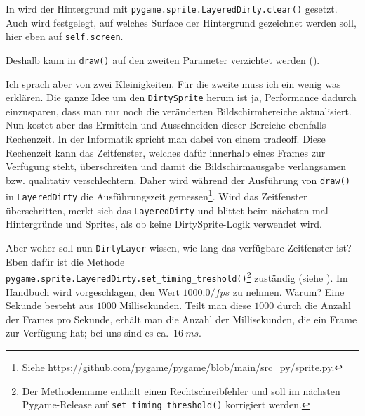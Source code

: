 In  wird der Hintergrund mit \texttt{pygame.sprite.LayeredDirty.clear()} gesetzt. Auch wird festgelegt, auf welches Surface der Hintergrund gezeichnet werden soll, hier eben auf \texttt{self.screen}.


Deshalb kann in \texttt{draw()} auf den zweiten Parameter verzichtet werden ().


Ich sprach aber von zwei Kleinigkeiten. Für die zweite muss ich ein wenig was erklären. Die ganze Idee um den \texttt{DirtySprite} herum ist ja, Performance dadurch einzusparen, dass man nur noch die veränderten Bildschirmbereiche aktualisiert. Nun kostet aber das Ermitteln und Ausschneiden dieser Bereiche ebenfalls Rechenzeit. In der Informatik spricht man dabei von einem \gls{tradeoff}. Diese Rechenzeit kann das Zeitfenster, welches dafür innerhalb eines Frames zur Verfügung steht, überschreiten und damit die Bildschirmausgabe verlangsamen bzw. qualitativ verschlechtern. Daher wird während der Ausführung von \texttt{draw()} in \texttt{LayeredDirty} die Ausführungszeit gemessen\footnote{Siehe \url{https://github.com/pygame/pygame/blob/main/src_py/sprite.py}.}. Wird das Zeitfenster überschritten, merkt sich das \texttt{LayeredDirty} und blittet beim nächsten mal Hintergründe und Sprites, als ob keine DirtySprite-Logik verwendet wird. 

Aber woher soll nun \texttt{DirtyLayer} wissen, wie lang das verfügbare Zeitfenster ist? Eben dafür ist die Methode \texttt{pygame.sprite.LayeredDirty.set\-\_tim\-ing\-\_tres\-hold()}\footnote{Der Methodenname enthält einen Rechtschreibfehler und soll im nächsten Pygame-Release auf \texttt{set\_timing\_threshold()} korrigiert werden.} zuständig (siehe ). Im Handbuch wird vorgeschlagen, den Wert $1000.0 / fps$ zu nehmen. Warum? Eine Sekunde besteht aus $1000$ Millisekunden. Teilt man diese $1000$ durch die Anzahl der Frames pro Sekunde, erhält man die Anzahl der Millisekunden, die ein Frame zur Verfügung hat; bei uns sind es ca.~$16~ms$.

